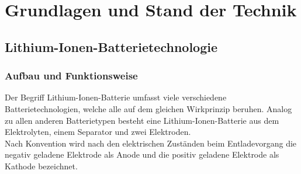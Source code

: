 \section{Grundlagen und Stand der Technik}\label{sec:GrundlagenUSdT}

\subsection{Lithium-Ionen-Batterietechnologie}\label{subsec:LIB}

\subsubsection*{Aufbau und Funktionsweise}\label{subsec*:LIBAufbau}

Der Begriff Lithium-Ionen-Batterie umfasst viele verschiedene Batterietechnologien, welche alle auf dem gleichen Wirkprinzip beruhen. Analog zu allen anderen Batterietypen besteht eine Lithium-Ionen-Batterie aus dem Elektrolyten, einem Separator und zwei Elektroden.\\
Nach Konvention wird nach den elektrischen Zuständen beim Entladevorgang die negativ geladene Elektrode als Anode und die positiv geladene Elektrode als Kathode bezeichnet.\\

